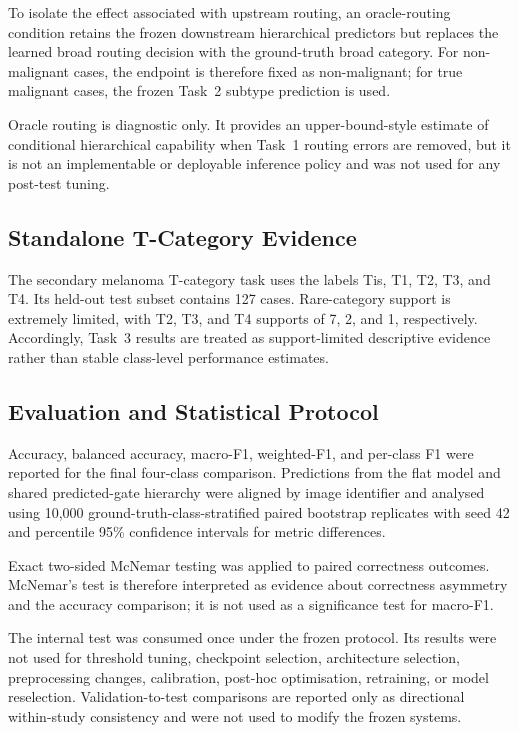 To isolate the effect associated with upstream routing, an oracle-routing
condition retains the frozen downstream hierarchical predictors but replaces
the learned broad routing decision with the ground-truth broad category. For
non-malignant cases, the endpoint is therefore fixed as non-malignant; for
true malignant cases, the frozen Task~2 subtype prediction is used.

Oracle routing is diagnostic only. It provides an upper-bound-style estimate
of conditional hierarchical capability when Task~1 routing errors are removed,
but it is not an implementable or deployable inference policy and was not used
for any post-test tuning.

\subsection{Standalone T-Category Evidence}

The secondary melanoma T-category task uses the labels Tis, T1, T2, T3, and
T4. Its held-out test subset contains 127 cases. Rare-category support is
extremely limited, with T2, T3, and T4 supports of 7, 2, and 1, respectively.
Accordingly, Task~3 results are treated as support-limited descriptive evidence
rather than stable class-level performance estimates.

\subsection{Evaluation and Statistical Protocol}

Accuracy, balanced accuracy, macro-F1, weighted-F1, and per-class F1 were
reported for the final four-class comparison. Predictions from the flat model
and shared predicted-gate hierarchy were aligned by image identifier and
analysed using 10,000 ground-truth-class-stratified paired bootstrap
replicates with seed 42 and percentile 95\% confidence intervals for metric
differences.

Exact two-sided McNemar testing was applied to paired correctness outcomes.
McNemar's test is therefore interpreted as evidence about correctness
asymmetry and the accuracy comparison; it is not used as a significance test
for macro-F1.

The internal test was consumed once under the frozen protocol. Its results
were not used for threshold tuning, checkpoint selection, architecture
selection, preprocessing changes, calibration, post-hoc optimisation,
retraining, or model reselection. Validation-to-test comparisons are reported
only as directional within-study consistency and were not used to modify the
frozen systems.
